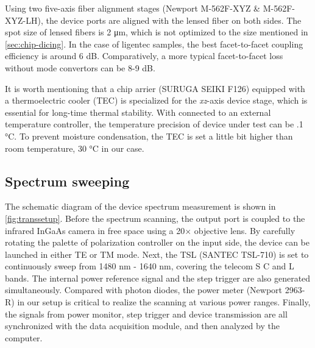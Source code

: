 Using two five-axis fiber alignment stages (Newport M-562F-XYZ \& M-562F-XYZ-LH), the device ports are aligned with the lensed fiber on both sides. The spot size of lensed fibers is 2 \si{\um}, which is not optimized to the size mentioned in \autoref{sec:chip-dicing}.
In the case of ligentec samples,  the best facet-to-facet coupling efficiency is around 6 dB. 
Comparatively, a more typical facet-to-facet loss without mode convertors can be 8-9 dB.


It is worth mentioning that a chip arrier (SURUGA SEIKI F126) equipped with a thermoelectric cooler (TEC) is specialized for the \textit{xz}-axis device stage, which is essential for long-time thermal stability. 
With connected to an external temperature controller, the temperature precision of device under test can be .1 \si{\celsius}.
To prevent moisture condensation, the TEC is set a little bit higher than room temperature, 30 \si{\celsius} in our case. 

\subsection{Spectrum sweeping}

\begin{figure}
	\centering
	
	\label{fig:transsetup}
\end{figure}

The schematic diagram of the device spectrum measurement is shown in \autoref{fig:transsetup}. Before the spectrum scanning, the output port is coupled to the infrared InGaAs camera in free space using a 20$\times$ objective lens. By carefully rotating the palette of polarization controller on the input side, the device can be launched in either TE or TM mode. Next, the TSL (SANTEC TSL-710) is set to continuously sweep from 1480 nm - 1640 nm, covering the telecom S C and L bands. The internal power reference signal and the step trigger are also generated simultaneously. Compared with photon diodes, the power meter (Newport 2963-R) in our setup is critical to realize the scanning at various power ranges.  Finally, the signals from power monitor, step trigger and device transmission are all synchronized with the data acquisition module, and then analyzed by the computer.

